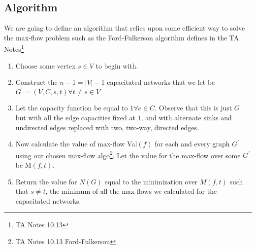 \documentclass{article}
\begin{document}
\subsection{Algorithm}
We are going to define an algorithm that relies upon some efficient way to solve the
max-flow problem such as the Ford-Fulkerson algorithm defines in the TA Notes\footnote{TA
Notes 10.13}
\begin{enumerate}
      \item Choose some vertex \(s \in V\) to begin with.
      \item Construct the \(n - 1=
      |V| -1\) capacitated networks that we let be \(G^{\prime} = (V, C, s, t) \forall t
      \neq s \in V\) 
      \item Let the capacity function be equal to \(1 \forall e \in C\). Observe that this
      is just \(G\) but with all the edge capacities fixed at \(1\), and with alternate
      sinks and undirected edges replaced with two, two-way, directed edges. 
      \item Now calculate the value of max-flow Val\((f)\) for each and every graph
      \(G^\prime \) using our chosen max-flow algo\footnote{TA Notes 10.13 Ford-Fulkerson}.
      Let the value for the max-flow over some \(G^\prime \) be M\((f,t)\).
      \item Return the value for \(N(G)\) equal to the minimization over \(M(f,t)\) such
      that \(s \neq t\), the minimum of all the max-flows we calculated for the
      capacitated networks. 
\end{enumerate}
\end{document}
